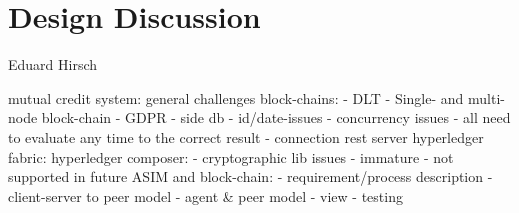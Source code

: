 \chapter{Design Discussion}
\label{ch:design}

\vspace{-1cm}
\begin{center}
Eduard Hirsch
\end{center}

mutual credit system:
general challenges block-chains:
  - DLT
  - Single- and multi-node block-chain
  - GDPR - side db
  - id/date-issues
  - concurrency issues - all need to evaluate any time to the correct result
  - connection rest server
hyperledger fabric:
hyperledger composer:
  - cryptographic lib issues
  - immature
  - not supported in future
ASIM and block-chain:
  - requirement/process description
  - client-server to peer model
  - agent \& peer model - view 
  - testing
